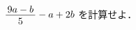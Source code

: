 \documentclass[../../../../hsm_tok_q.tex]{subfiles}
\begin{document}
    $\myfraca{9a-b}{5} - a + 2b$\; を計算せよ．
\end{document}
